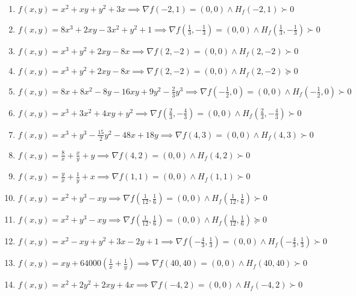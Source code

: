 \documentclass[11pt,a4paper]{article}
\begin{document}
\begin{enumerate}
\item $\displaystyle f(x, y) = x^{2} + xy + y^{2} + 3x \implies \nabla f(-2, 1) = (0, 0) \land H_{f}(-2, 1) \succ 0$
\item $\displaystyle f(x, y) = 8x^{3} + 2xy - 3x^{2} + y^{2} + 1 \implies \nabla f\left( \frac{1}{3}, -\frac{1}{3} \right) = (0, 0) \land H_{f}\left( \frac{1}{3}, -\frac{1}{3} \right) \succ 0$
\item $\displaystyle f(x, y) = x^{3} + y^{2} + 2xy - 8x \implies \nabla f(2, -2) = (0, 0) \land H_{f}(2, -2) \succ 0$
\item $\displaystyle f(x, y) = x^{3} + y^{2} + 2xy - 8x \implies \nabla f(2, -2) = (0, 0) \land H_{f}(2, -2) \succeq 0$
\item $\displaystyle f(x, y) = 8x + 8x^{2} - 8y - 16xy + 9y^{2} - \frac{2}{3} y^{3} \implies \nabla f\left( -\frac{1}{2}, 0 \right) = (0, 0) \land H_{f}\left( -\frac{1}{2}, 0 \right) \succ 0$
\item $\displaystyle f(x, y) = x^{3} + 3x^{2} + 4xy + y^{2} \implies \nabla f\left( \frac{2}{3}, -\frac{4}{3} \right) = (0, 0) \land H_{f}\left( \frac{2}{3}, -\frac{4}{3} \right) \succ 0$
\item $\displaystyle f(x, y) = x^{3} + y^{3} - \frac{15}{2} y^{2} - 48x + 18y \implies \nabla f(4, 3) = (0, 0) \land H_{f}(4, 3) \succ 0$
\item $\displaystyle f(x, y) = \frac{8}{x} + \frac{x}{y} + y \implies \nabla f(4, 2) = (0, 0) \land H_{f}(4, 2) \succ 0$
\item $\displaystyle f(x, y) = \frac{y}{x} + \frac{1}{y} + x \implies \nabla f(1, 1) = (0, 0) \land H_{f}(1, 1) \succ 0$
\item $\displaystyle f(x, y) = x^{2} + y^{3} - xy \implies \nabla f\left( \frac{1}{12}, \frac{1}{6} \right) = (0, 0) \land H_{f}\left( \frac{1}{12}, \frac{1}{6} \right) \succ 0$
\item $\displaystyle f(x, y) = x^{2} + y^{3} - xy \implies \nabla f\left( \frac{1}{12}, \frac{1}{6} \right) = (0, 0) \land H_{f}\left( \frac{1}{12}, \frac{1}{6} \right) \succeq 0$
\item $\displaystyle f(x, y) = x^{2} - xy + y^{2} + 3x - 2y + 1 \implies \nabla f\left( -\frac{4}{3}, \frac{1}{3} \right) = (0, 0) \land H_{f}\left( -\frac{4}{3}, \frac{1}{3} \right) \succ 0$
\item $\displaystyle f(x, y) = xy + 64000\left( \frac{1}{x} + \frac{1}{y} \right) \implies \nabla f(40, 40) = (0, 0) \land H_{f}(40, 40) \succ 0$
\item $\displaystyle f(x, y) = x^{2} + 2y^{2} + 2xy + 4x \implies \nabla f(-4, 2) = (0, 0) \land H_{f}(-4, 2) \succ 0$

\end{enumerate}
\end{document}
